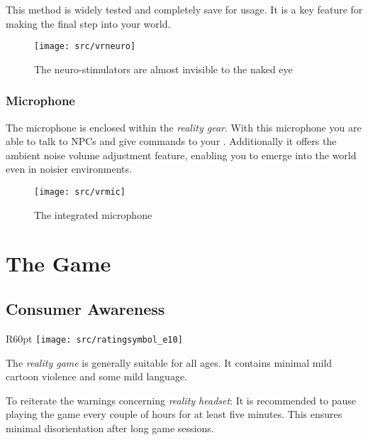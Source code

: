 This method is widely tested and completely save for usage. It is a key feature for making the final step into your \poke{} world.

\begin{figure}[!ht]
\begin{center}
\texttt{[image: src/vrneuro]}
\end{center}
\caption[The neuro-stimulators are almost invisible to the naked eye]{The neuro-stimulators are almost invisible to the naked eye}
\label{vrneuro}
\end{figure}

\subsection{Microphone}
The microphone is enclosed within the \emph{\poke{} reality gear}. With this microphone you are able to talk to NPCs and give commands to your \poke{}. Additionally it offers the ambient noise volume adjustment feature, enabling you to emerge into the \poke{} world even in noisier environments.

\begin{figure}[!ht]
\begin{center}
\texttt{[image: src/vrmic]}
\end{center}
\caption[The integrated microphone]{The integrated microphone}
\label{vrmic}
\end{figure}

\chapter{The Game}
\label{software}

\section{Consumer Awareness}
\begin{wrapfigure}{R}{60pt}
\vspace{-18pt}
\texttt{[image: src/ratingsymbol\_e10]}
\vspace{-30pt}
\end{wrapfigure}
The \emph{\poke{} reality game} is generally suitable for all ages. It contains minimal mild cartoon violence and some mild language.

To reiterate the warnings concerning \emph{\poke{} reality headset}: It is recommended to pause playing the game every couple of hours for at least five minutes. This ensures minimal disorientation after long game sessions.

